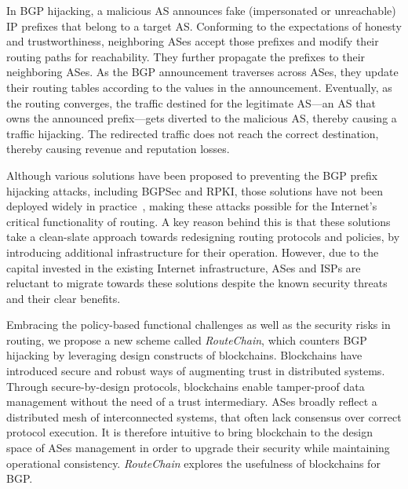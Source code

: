 \documentclass[conference]{IEEEtran}
\newcommand{\rc}{{{\em RouteChain}}\xspace}
\begin{document}
In BGP hijacking, a malicious AS announces fake (impersonated or unreachable) IP prefixes that belong to a target AS. Conforming to the expectations of honesty and trustworthiness, neighboring ASes accept those prefixes and modify their routing paths for reachability. They further propagate the prefixes to their neighboring ASes. As the BGP announcement traverses across ASes, they update their routing tables according to the values in the announcement. Eventually, as the routing converges, the traffic destined for the legitimate AS---an AS that owns the announced prefix---gets diverted to the malicious AS, thereby causing a traffic hijacking. The redirected traffic does not reach the correct destination, thereby causing revenue and reputation losses. 



Although various solutions have been proposed to preventing the BGP prefix hijacking attacks, including BGPSec and RPKI, those solutions have not been deployed widely in practice~\cite{QiuGRN07}, making these attacks possible for the Internet's critical functionality of routing. A key reason behind this is that these solutions take a clean-slate approach towards redesigning routing protocols and policies, by introducing additional infrastructure for their operation. However, due to the capital invested in the existing Internet infrastructure, ASes and ISPs are reluctant to migrate towards these solutions despite the known security threats and their clear benefits. 


Embracing the policy-based functional challenges as well as the security risks in routing, we propose a new scheme called \rc, which counters BGP hijacking by leveraging design constructs of blockchains. Blockchains have introduced secure and robust ways of augmenting trust in distributed systems. Through secure-by-design protocols, blockchains enable tamper-proof data management without the need of a trust intermediary. ASes broadly reflect a distributed mesh of interconnected systems, that often lack consensus over correct protocol execution. It is therefore intuitive to bring blockchain to the design space of ASes management in order to upgrade their security while maintaining operational consistency. \rc explores the usefulness of blockchains for BGP. 
\end{document}
